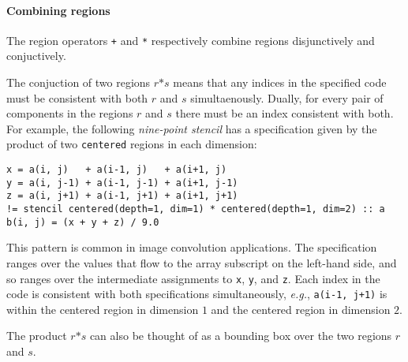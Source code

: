 \documentclass[10pt,preprint]{sigplanconf}
\theoremstyle{definition}
\newcommand{\eg}{\emph{e.g.}}
\newcommand{\term}[1]{\texttt{#1}}
\begin{document}
\paragraph{Combining regions}




%

The region operators \term{+} and \term{*} respectively combine
regions disjunctively and conjuctively.

The conjuction of two regions $r \term{*} s$ means that any indices
in the specified code must be consistent with both $r$ and $s$
simultaenously. Dually, for every pair of components in the regions
$r$ and $s$ there must be an index consistent with both.
For example, the following \emph{nine-point stencil}
has a specification given by the product of two \texttt{centered}
regions in each dimension:
\begin{verbatim}
x = a(i, j)   + a(i-1, j)   + a(i+1, j)
y = a(i, j-1) + a(i-1, j-1) + a(i+1, j-1)
z = a(i, j+1) + a(i-1, j+1) + a(i+1, j+1)
!= stencil centered(depth=1, dim=1) * centered(depth=1, dim=2) :: a
b(i, j) = (x + y + z) / 9.0
\end{verbatim}
This pattern is common in image convolution applications.
The specification ranges over the
values that flow to the array subscript on the left-hand side,
and so ranges over the intermediate assignments to \term{x},
\term{y}, and \term{z}. Each index in the code is consistent
with both specifications simultaneously, \eg{}, \texttt{a(i-1, j+1)}
is within the centered region in dimension $1$ and the centered region
in dimension $2$.

The product $r \term{*} s$ can also be thought of as a bounding box
over the two regions $r$ and $s$.
\end{document}
